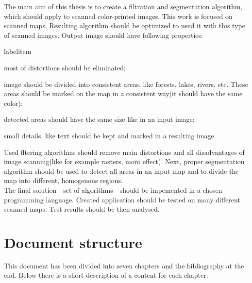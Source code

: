 \documentclass[a4paper,onecolumn,oneside,12pt]{memoir}
\makeatletter
\renewenvironment{itemize}{
  \begin{list}{  
  \csname labelitem\romannumeral\the\@listdepth\endcsname}{
  \setlength{\leftmargin}{1em}
	\setlength{\topsep}{6pt}%
	\setlength{\partopsep}{0pt}%
	\setlength{\parskip}{0pt}%
	\setlength{\parsep}{0pt}%
	\setlength{\itemsep}{0pt}}
}{
  \end{list}
}
\makeatother
\begin{document}
The main aim of this thesis is to create a filtration and segmentation algorithm, which should
apply to scanned color-printed images. This work is focused on scanned maps. 
Resulting algorithm should be optimized to used it with this type of scanned images. 
Output image should have following properties:

\begin{itemize}
  \item most of distortions should be eliminated;
  \item image should be divided into consistent areas, like forests, lakes, rivers, etc. These areas
        should be marked on the map in a consistent way(it should have the same color);
  \item detected areas should have the same size like in an input image;
  \item small details, like text should be kept and marked in a resulting image.
\end{itemize}

Used fltering algorithms should remove main distortions and all disadvantages of image scanning(like
for example rasters, moro effect). Next, proper segmentation algorithm should be used to detect all
areas in an input map and to divide the map into different, homogenous regions. \\

The final solution - set of algorithms - should be impemented in a chosen programming language.
Created application should be tested on many different scanned maps. Test results should be then
analysed.

\section{Document structure}

This document has been divided into seven chapters and the bibliography at the end.
Below there is a short description of a content for each chapter:

\end{document}
